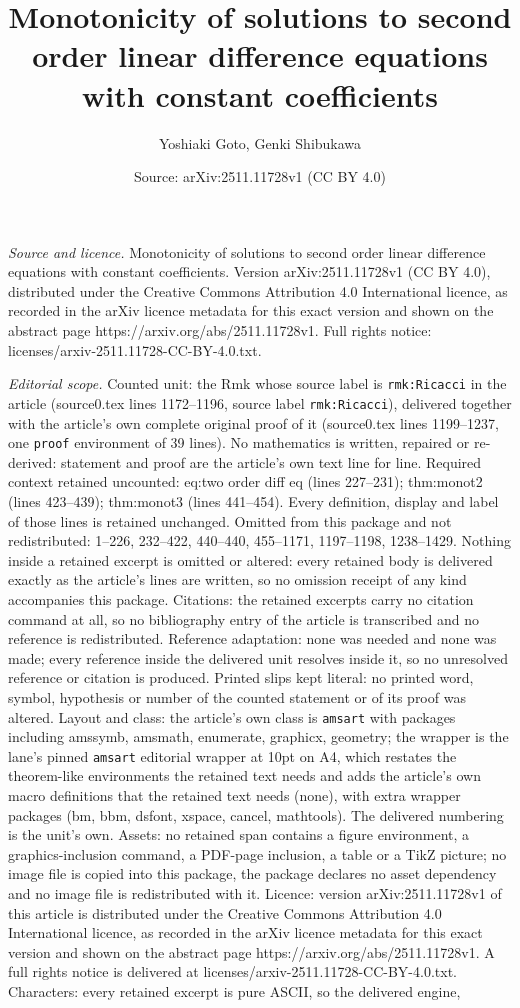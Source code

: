 \documentclass[10pt,a4paper]{amsart}
\title[Monotonicity of solutions to second order linear difference ]{Monotonicity of solutions to second order linear difference equations with constant coefficients}
\author{Yoshiaki Goto, Genki Shibukawa}
\date{Source: arXiv:2511.11728v1 (CC BY 4.0)}
\begin{document}
\maketitle

\noindent\emph{Source and licence.} Monotonicity of solutions to second order linear difference equations with constant coefficients. Version arXiv:2511.11728v1 (CC BY 4.0), distributed under the Creative Commons Attribution 4.0 International licence, as recorded in the arXiv licence metadata for this exact version and shown on the abstract page https://arxiv.org/abs/2511.11728v1. Full rights notice: licenses/arxiv-2511.11728-CC-BY-4.0.txt.\par\smallskip

\noindent\textit{Editorial scope.} Counted unit: the Rmk whose source label is \texttt{rmk:Ricacci} in the article (source0.tex lines 1172--1196, source label \texttt{rmk:Ricacci}), delivered together with the article's own complete original proof of it (source0.tex lines 1199--1237, one \texttt{proof} environment of 39 lines). No mathematics is written, repaired or re-derived: statement and proof are the article's own text line for line. Required context retained uncounted: eq:two order diff eq (lines 227--231); thm:monot2 (lines 423--439); thm:monot3 (lines 441--454). Every definition, display and label of those lines is retained unchanged. Omitted from this package and not redistributed: 1--226, 232--422, 440--440, 455--1171, 1197--1198, 1238--1429. Nothing inside a retained excerpt is omitted or altered: every retained body is delivered exactly as the article's lines are written, so no omission receipt of any kind accompanies this package. Citations: the retained excerpts carry no citation command at all, so no bibliography entry of the article is transcribed and no reference is redistributed. Reference adaptation: none was needed and none was made; every reference inside the delivered unit resolves inside it, so no unresolved reference or citation is produced. Printed slips kept literal: no printed word, symbol, hypothesis or number of the counted statement or of its proof was altered. Layout and class: the article's own class is \texttt{amsart} with packages including amssymb, amsmath, enumerate, graphicx, geometry; the wrapper is the lane's pinned \texttt{amsart} editorial wrapper at 10pt on A4, which restates the theorem-like environments the retained text needs and adds the article's own macro definitions that the retained text needs (none), with extra wrapper packages (bm, bbm, dsfont, xspace, cancel, mathtools). The delivered numbering is the unit's own. Assets: no retained span contains a figure environment, a graphics-inclusion command, a PDF-page inclusion, a table or a TikZ picture; no image file is copied into this package, the package declares no asset dependency and no image file is redistributed with it. Licence: version arXiv:2511.11728v1 of this article is distributed under the Creative Commons Attribution 4.0 International licence, as recorded in the arXiv licence metadata for this exact version and shown on the abstract page https://arxiv.org/abs/2511.11728v1. A full rights notice is delivered at licenses/arxiv-2511.11728-CC-BY-4.0.txt. Characters: every retained excerpt is pure ASCII, so the delivered engine, 
\end{document}
